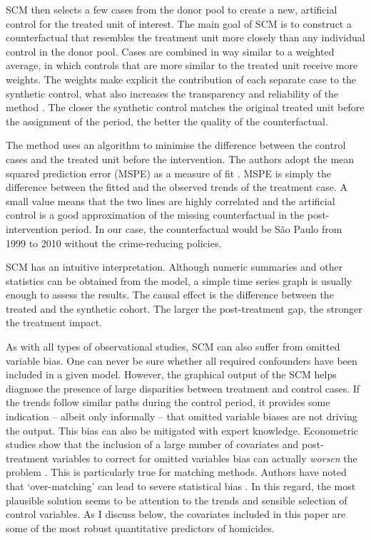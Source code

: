 SCM then selects a few cases from the donor pool to create a new, artificial control for the treated unit of interest. The main goal of SCM is to construct a counterfactual that resembles the treatment unit more closely than any individual control in the donor pool. Cases are combined in way similar to a weighted average, in which controls that are more similar to the treated unit receive more weights. The weights make explicit the contribution of each separate case to the synthetic control, what also increases the transparency and reliability of the method \citep{abadie2014}. The closer the synthetic control matches the original treated unit before the assignment of the period, the better the quality of the counterfactual. 

The method uses an algorithm to minimise the difference between the control cases and the treated unit before the intervention. The authors adopt the mean squared prediction error (MSPE) as a measure of fit \citep{abadie2003}. MSPE is simply the difference between the fitted and the observed trends of the treatment case. A small value means that the two lines are highly correlated and the artificial control is a good approximation of the missing counterfactual in the post-intervention period. In our case, the counterfactual would be São Paulo from 1999 to 2010 without the crime-reducing policies.

SCM has an intuitive interpretation. Although numeric summaries and other statistics can be obtained from the model, a simple time series graph is usually enough to assess the results. The causal effect is the difference between the treated and the synthetic cohort. The larger the post-treatment gap, the stronger the treatment impact. 

As with all types of observational studies, SCM can also suffer from omitted variable bias. One can never be sure whether all required confounders have been included in a given model. However, the graphical output of the SCM helps diagnose the presence of large disparities between treatment and control cases. If the trends follow similar paths during the control period, it provides some indication -- albeit only informally -- that omitted variable biases are not driving the output. This bias can also be mitigated with expert knowledge. Econometric studies show that the inclusion of a large number of covariates and post-treatment variables to correct for omitted variables bias can actually \emph{worsen} the problem \citep{achen1992social, achen2002toward, clarke2005phantom, clarke2009return, pearl2009causality}. This is particularly true for matching methods. Authors have noted that `over-matching' can lead to severe statistical bias \citep{baser2006too, brookhart2006variable, marsh2002removal}. In this regard, the most plausible solution seems to be attention to the trends and sensible selection of control variables. As I discuss below, the covariates included in this paper are some of the most robust quantitative predictors of homicides.

